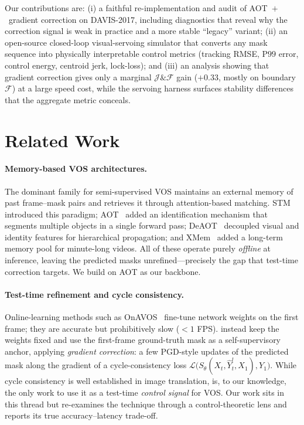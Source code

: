 \documentclass{article}
\begin{document}
Our contributions are: (i) a faithful re-implementation and audit of AOT~$+$~gradient correction on DAVIS-2017, including diagnostics that reveal why the correction signal is weak in practice and a more stable ``legacy'' variant; (ii) an open-source closed-loop visual-servoing simulator that converts any mask sequence into physically interpretable control metrics (tracking RMSE, $\mathrm{P}99$ error, control energy, centroid jerk, lock-loss); and (iii) an analysis showing that gradient correction gives only a marginal $\mathcal{J}\&\mathcal{F}$ gain ($+0.33$, mostly on boundary $\mathcal{F}$) at a large speed cost, while the servoing harness surfaces stability differences that the aggregate metric conceals.

\section{Related Work}

\paragraph{Memory-based VOS architectures.}
The dominant family for semi-supervised VOS maintains an external memory of past frame--mask pairs and retrieves it through attention-based matching. STM~\citep{oh2019stm} introduced this paradigm; AOT~\citep{yang2021aot} added an identification mechanism that segments multiple objects in a single forward pass; DeAOT~\citep{yang2022deaot} decoupled visual and identity features for hierarchical propagation; and XMem~\citep{cheng2022xmem} added a long-term memory pool for minute-long videos. All of these operate purely \emph{offline} at inference, leaving the predicted masks unrefined---precisely the gap that test-time correction targets. We build on AOT as our backbone.

\paragraph{Test-time refinement and cycle consistency.}
Online-learning methods such as OnAVOS~\citep{voigtlaender2017onavos} fine-tune network weights on the first frame; they are accurate but prohibitively slow ($<\!1$ FPS). \citet{li2020cycle} instead keep the weights fixed and use the first-frame ground-truth mask as a self-supervisory anchor, applying \emph{gradient correction}: a few PGD-style updates of the predicted mask along the gradient of a cycle-consistency loss $\mathcal{L}\bigl(S_\theta(X_t,\hat Y^{l}_t,X_1),Y_1\bigr)$. While cycle consistency is well established in image translation, \citet{li2020cycle} is, to our knowledge, the only work to use it as a test-time \emph{control signal} for VOS. Our work sits in this thread but re-examines the technique through a control-theoretic lens and reports its true accuracy--latency trade-off.
\end{document}
